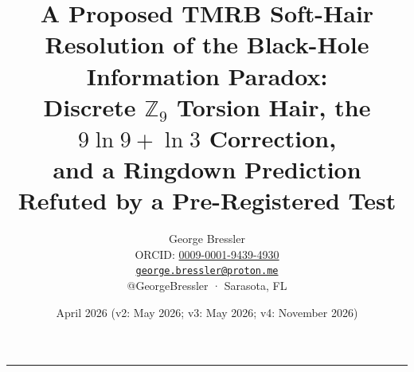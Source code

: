 \documentclass[11pt,a4paper]{article}
\begin{document}
\title{%
  \textbf{A Proposed TMRB Soft-Hair Resolution of the Black-Hole Information Paradox:}\\[4pt]
  \textbf{Discrete $\mathbb{Z}_9$ Torsion Hair, the $9\ln 9 + \ln 3$ Correction,}\\[4pt]
  \textbf{and a Ringdown Prediction Refuted by a Pre-Registered Test}%
}
\author{%
  George Bressler\\[2pt]
  ORCID: \href{https://orcid.org/0009-0001-9439-4930}{0009-0001-9439-4930}\\
  \href{mailto:george.bressler@proton.me}{\texttt{george.bressler@proton.me}}\\
  @GeorgeBressler · Sarasota, FL
}
\date{April 2026 (v2: May 2026; v3: May 2026; v4: November 2026)}
\maketitle
\thispagestyle{fancy}

\vspace{4pt}
\begin{center}
{\color{gold}\rule{0.38\textwidth}{0.4pt}}
\end{center}
\vspace{2pt}
\end{document}
